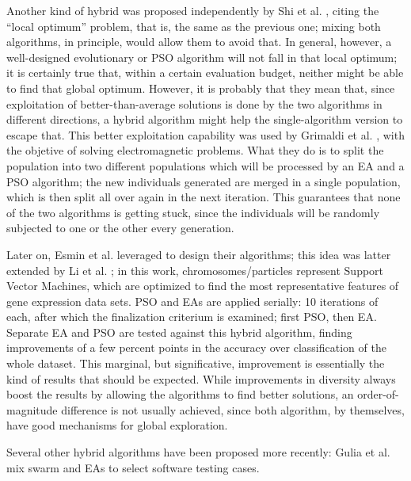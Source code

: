 Another kind of hybrid was proposed independently by 
Shi et al. \cite{shi2003hybrid}, citing the ``local optimum'' problem,
that is, the same as the previous one;
mixing both algorithms, in principle, would allow them to avoid
that. In general, however, a well-designed evolutionary or PSO
algorithm will not fall in that local optimum; it is certainly true
that, within a certain evaluation budget, neither might be able to
find that global optimum. However, it is probably that they mean that,
since exploitation of better-than-average solutions is done by the two
algorithms in different directions, a hybrid algorithm might help the
single-algorithm version to escape that.
This better exploitation capability was used by Grimaldi et al. \cite{grimaldi2005genetical}, %
with the objetive of solving electromagnetic problems. What they do is
to split the population into two different populations which will be
processed by an EA and a PSO algorithm; the new individuals generated
are merged in a single population, which is then split all over again
in the next iteration. This guarantees that none of the two algorithms
is getting stuck, since the individuals will be randomly subjected to
one or the other every generation.


Later on, Esmin et al. \cite{esmin2006hybrid} leveraged to design their
algorithms; this idea was
latter extended by Li et al. \cite{li2008gene}; in this work,
chromosomes/particles represent Support Vector Machines, which are
optimized to find the most representative features of gene expression
data sets. PSO and EAs are applied serially: 10 iterations of each,
after which the finalization criterium is examined; first PSO, then
EA. Separate EA and PSO are tested against this hybrid algorithm,
finding improvements of a few percent points in the accuracy over
classification of the whole dataset. This marginal, but significative,
improvement is essentially the kind of results that should be
expected. While improvements in diversity always boost the results by
allowing the algorithms to find better solutions, an
order-of-magnitude difference is not usually  achieved, since both
algorithm, by themselves, have good mechanisms for global
exploration.

Several other hybrid algorithms have been proposed more recently:
Gulia et al. \cite{gulia2019hybrid} mix swarm and EAs to select
software testing cases. %


